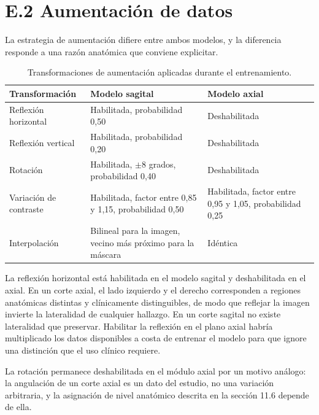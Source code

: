 \section*{E.2 Aumentación de datos}
\label{anexo:entrenamiento-f2-aumentacion}

La estrategia de aumentación difiere entre ambos modelos, y la diferencia responde a una razón anatómica que conviene explicitar.

\begin{table}[H]
\small
\centering
\caption{Transformaciones de aumentación aplicadas durante el entrenamiento.}
\label{tab:anexo-e-aumentacion}
\begin{tabularx}{\textwidth}{|>{\raggedright\arraybackslash}p{}|>{\raggedright\arraybackslash}X|>{\raggedright\arraybackslash}X|}
\hline
\textbf{Transformación} & \textbf{Modelo sagital} & \textbf{Modelo axial} \\
\hline
Reflexión horizontal & Habilitada, probabilidad 0,50 & Deshabilitada \\
\hline
Reflexión vertical & Habilitada, probabilidad 0,20 & Deshabilitada \\
\hline
Rotación & Habilitada, $\pm 8$ grados, probabilidad 0,40 & Deshabilitada \\
\hline
Variación de contraste & Habilitada, factor entre 0,85 y 1,15, probabilidad 0,50 & Habilitada, factor entre 0,95 y 1,05, probabilidad 0,25 \\
\hline
Interpolación & Bilineal para la imagen, vecino más próximo para la máscara & Idéntica \\
\hline
\end{tabularx}
\end{table}

La reflexión horizontal está habilitada en el modelo sagital y deshabilitada en el axial. En un corte axial, el lado izquierdo y el derecho corresponden a regiones anatómicas distintas y clínicamente distinguibles, de modo que reflejar la imagen invierte la lateralidad de cualquier hallazgo. En un corte sagital no existe lateralidad que preservar. Habilitar la reflexión en el plano axial habría multiplicado los datos disponibles a costa de entrenar el modelo para que ignore una distinción que el uso clínico requiere.

La rotación permanece deshabilitada en el módulo axial por un motivo análogo: la angulación de un corte axial es un dato del estudio, no una variación arbitraria, y la asignación de nivel anatómico descrita en la sección 11.6 depende de ella. %

